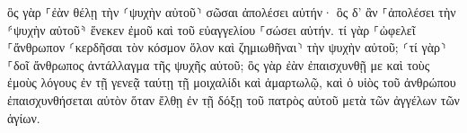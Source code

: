 \documentclass{openreader}
\begin{document}
ὃς γὰρ ⸀ἐὰν θέλῃ τὴν ⸂ψυχὴν αὐτοῦ⸃ σῶσαι ἀπολέσει αὐτήν· ὃς δ’ ἂν ⸀ἀπολέσει τὴν ⸄ψυχὴν αὐτοῦ⸅ ἕνεκεν ἐμοῦ καὶ τοῦ εὐαγγελίου ⸀σώσει αὐτήν. 
τί γὰρ ⸀ὠφελεῖ ⸀ἄνθρωπον ⸂κερδῆσαι τὸν κόσμον ὅλον καὶ ζημιωθῆναι⸃ τὴν ψυχὴν αὐτοῦ; 
⸂τί γὰρ⸃ ⸀δοῖ ἄνθρωπος ἀντάλλαγμα τῆς ψυχῆς αὐτοῦ; 
ὃς γὰρ ἐὰν ἐπαισχυνθῇ με καὶ τοὺς ἐμοὺς λόγους ἐν τῇ γενεᾷ ταύτῃ τῇ μοιχαλίδι καὶ ἁμαρτωλῷ, καὶ ὁ υἱὸς τοῦ ἀνθρώπου ἐπαισχυνθήσεται αὐτὸν ὅταν ἔλθῃ ἐν τῇ δόξῃ τοῦ πατρὸς αὐτοῦ μετὰ τῶν ἀγγέλων τῶν ἁγίων. 
\end{document}
